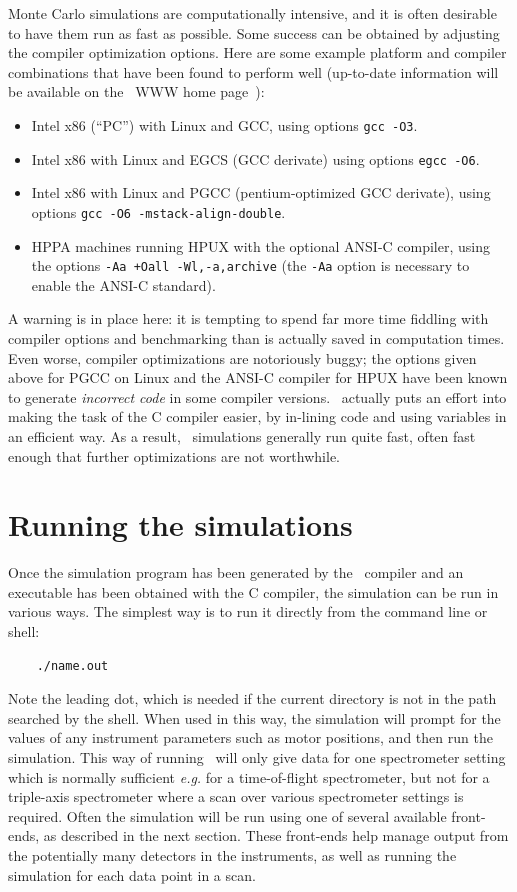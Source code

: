 Monte Carlo simulations are computationally intensive, and it is
often desirable to have them run as fast as possible. Some success can
be obtained by adjusting the compiler optimization
options. Here are some example platform and compiler combinations that
have been found to perform well (up-to-date information will be
available on the \MCS\ WWW home page~\cite{mcstas_webpage}):
\begin{itemize}
\item Intel x86 (``PC'') with Linux and GCC, using options \verb+gcc -O3+.
\item Intel x86 with Linux and EGCS (GCC derivate) using
  options \verb+egcc -O6+.
\item Intel x86 with Linux and PGCC (pentium-optimized GCC derivate), using
  options \verb+gcc -O6 -mstack-align-double+.
\item HPPA machines running HPUX with the optional ANSI-C compiler,
  using the options
  \verb|-Aa +Oall -Wl,-a,archive| (the \verb+-Aa+ option is necessary to
  enable the ANSI-C standard).
\end{itemize}
A warning is in place here: it is tempting to spend far more time
fiddling with compiler options and benchmarking than is actually saved
in computation times. Even worse, compiler optimizations are notoriously
buggy; the options given above for PGCC on Linux and the ANSI-C compiler
for HPUX have been known to generate \emph{incorrect code} in some
compiler versions. \MCS\ actually puts an effort into making the task of the C compiler
easier, by in-lining code and using variables in an efficient way. As a
result, \MCS\ simulations generally run quite fast, often fast enough
that further optimizations are not worthwhile.



\section{Running the simulations}
\label{s:run-sim}

Once the simulation program has been generated by the \MCS\ compiler
and an executable has been obtained with the C compiler, the simulation
can be run in various ways. The simplest way is to run it directly from the
command line or shell:
\begin{verbatim}
    ./name.out
\end{verbatim}
Note the leading dot, which is needed if the current directory is not in
the path searched by the shell. When used in this way, the simulation
will prompt for the values of any instrument parameters such as motor
positions, and then run the simulation.  
This way of running \MCS\ will only give data for one spectrometer
setting which is normally sufficient {\em e.g.} for a time-of-flight
spectrometer, but not for a triple-axis spectrometer where a scan over
various spectrometer settings is required.
Often the simulation will be run using one of several
available front-ends, as described in the next section. These front-ends
help manage output from the potentially many detectors in the
instruments, as well as running the simulation for each data point in
a scan.

